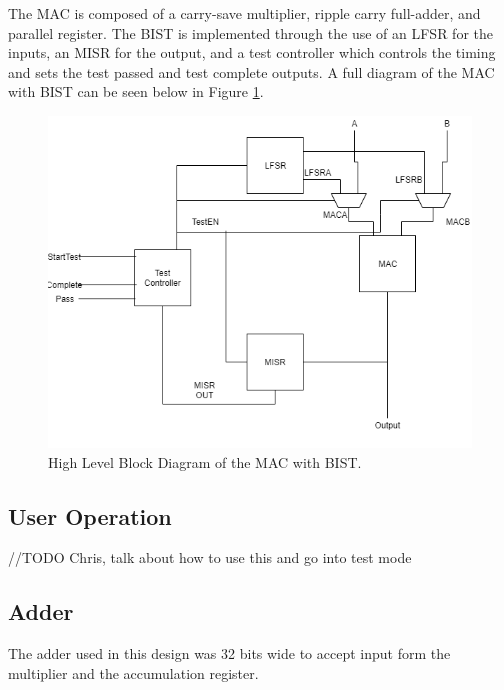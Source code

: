 \documentclass[11pt]{article}
\begin{document}
	The MAC is composed of a carry-save multiplier, ripple carry full-adder, and parallel register. The BIST is implemented through the use of an LFSR for the inputs, an MISR for the output, and a test controller which controls the timing and sets the test passed and test complete outputs. A full diagram of the MAC with BIST can be seen below in Figure \ref{fig:full-project-block}.
	
	\begin{figure}[H]
		\centering
		\includegraphics[width=0.7\linewidth]{Pictures/Full-Project-Block}
		\caption{High Level Block Diagram of the MAC with BIST.}
		\label{fig:full-project-block}
	\end{figure}


	\subsection{User Operation}
		//TODO Chris, talk about how to use this and go into test mode
	

	\subsection{Adder}
	
		The adder used in this design was 32 bits wide to accept input form the multiplier and the accumulation register. 
	
\end{document}

